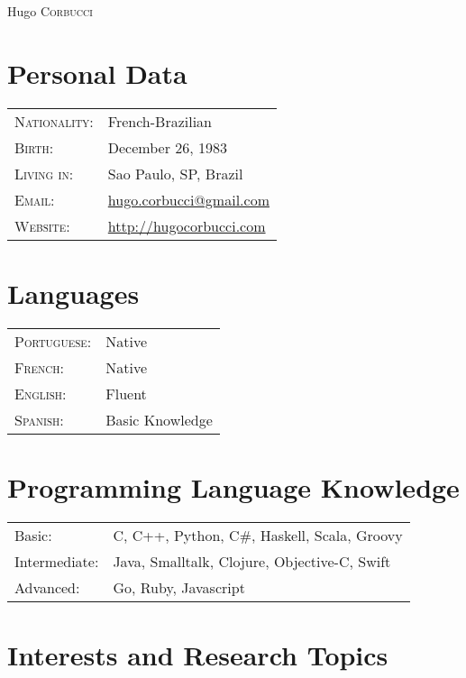 \documentclass[letter,10pt]{article}
\begin{document}
\par{\centering
		{\Huge Hugo \textsc{Corbucci}
	}\bigskip\par}

      \section{Personal Data}

\begin{tabular}{p{2.5cm}l}
  \textsc{Nationality:} & French-Brazilian
  \\
  \textsc{Birth:} & December 26, 1983 \\
  \textsc{Living in:}   & Sao Paulo, SP, Brazil \\
  \textsc{Email:}     &
  \href{mailto:hugo.corbucci@gmail.com}{hugo.corbucci@gmail.com}\\
  \textsc{Website:}     & \href{http://hugocorbucci.com}{http://hugocorbucci.com}
\end{tabular}

\section{Languages}
\begin{tabular}{p{2.5cm}l}
 \textsc{Portuguese:}&Native\\
 \textsc{French:}&Native\\
 \textsc{English:}&Fluent\\
 \textsc{Spanish:}&Basic Knowledge\\
\end{tabular}

\section{Programming Language Knowledge}
\begin{tabular}{p{2.5cm}l}
 Basic:& C, C++, Python, C\#, Haskell, Scala, Groovy\\
 Intermediate:& Java, Smalltalk, Clojure, Objective-C, Swift\\
 Advanced:& Go, Ruby, Javascript\\
\end{tabular}

\section{Interests and Research Topics}
\end{document}
